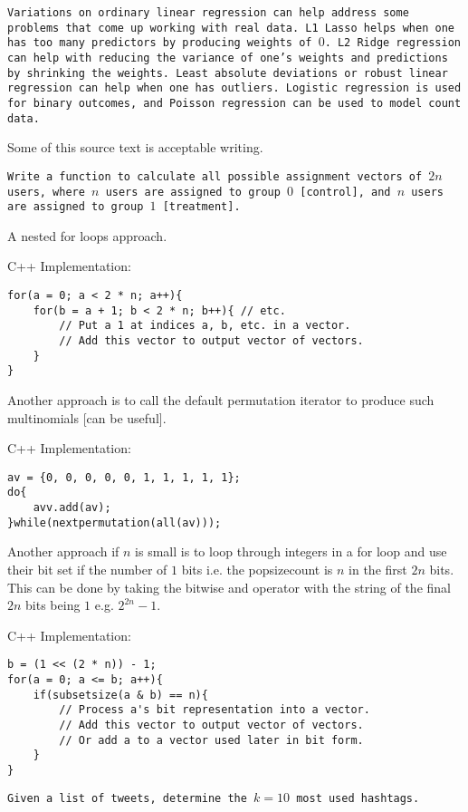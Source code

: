\texttt{Variations on ordinary linear regression can help address some problems that come up working with real data. L1 Lasso helps when one has too many predictors by producing weights of $0$. L2 Ridge regression can help with reducing the variance of one's weights and predictions by shrinking the weights. Least absolute deviations or robust linear regression can help when one has outliers. Logistic regression is used for binary outcomes, and Poisson regression can be used to model count data.}

Some of this source text is acceptable writing.

\texttt{Write a function to calculate all possible assignment vectors of $2n$ users, where $n$ users are assigned to group $0$ [control], and $n$ users are assigned to group $1$ [treatment].}

A nested for loops approach.

C++ Implementation:

\begin{verbatim}
for(a = 0; a < 2 * n; a++){
    for(b = a + 1; b < 2 * n; b++){ // etc.
        // Put a 1 at indices a, b, etc. in a vector.
        // Add this vector to output vector of vectors.
    }
}
\end{verbatim}

Another approach is to call the default permutation iterator to produce such multinomials [can be useful].

C++ Implementation:

\begin{verbatim}
av = {0, 0, 0, 0, 0, 1, 1, 1, 1, 1};
do{
    avv.add(av);
}while(nextpermutation(all(av)));
\end{verbatim}

Another approach if $n$ is small is to loop through integers in a for loop and use their bit set if the number of $1$ bits i.e. the popsizecount is $n$ in the first $2n$ bits. This can be done by taking the bitwise and operator with the string of the final $2n$ bits being $1$ e.g. $2^{2n}-1$.

C++ Implementation:

\begin{verbatim}
b = (1 << (2 * n)) - 1;
for(a = 0; a <= b; a++){
    if(subsetsize(a & b) == n){
        // Process a's bit representation into a vector.
        // Add this vector to output vector of vectors.
        // Or add a to a vector used later in bit form.
    }
}
\end{verbatim}

\texttt{Given a list of tweets, determine the $k=10$ most used hashtags.}

